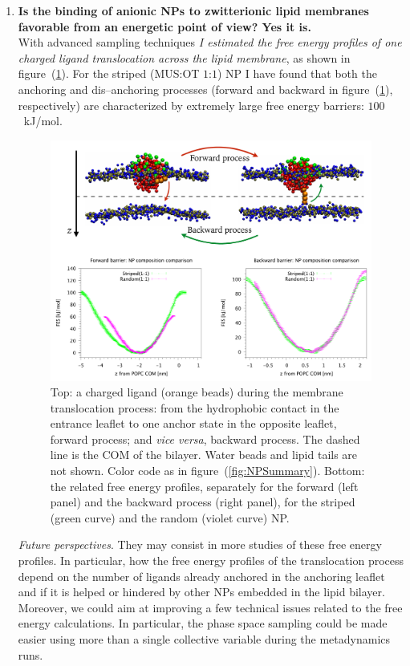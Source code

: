 \begin{enumerate}[label=\itshape\roman*.,listparindent=1em]
	\item \textbf{\textsf{Is the binding of anionic \acp{NP} to zwitterionic lipid membranes favorable from an energetic point of view? Yes it is.}}\\With advanced sampling techniques \textit{I estimated the free energy profiles of one charged ligand translocation across the lipid membrane}, as shown in figure~(\ref{fig:coglionazzo}). For the striped (\acs{MUS}:\acs{OT} $1$:$1$) \ac{NP} I have found that both the anchoring and dis--anchoring processes (forward and backward in figure~(\ref{fig:coglionazzo}), respectively) are characterized by extremely large free energy barriers: $100$~kJ/mol.%
\begin{figure}[ht]
	\center
	\includegraphics[width=1\textwidth]{./img/coglionazzo}
	\caption{Top: a charged ligand (orange beads) during the membrane translocation process: from the hydrophobic contact in the entrance leaflet to one anchor state in the opposite leaflet, forward process; and \textit{vice versa}, backward process. The dashed line is the \acs{COM} of the bilayer. Water beads and lipid tails are not shown. Color code as in figure~(\ref{fig:NPSummary}). Bottom: the related free energy profiles, separately for the forward (left panel) and the backward process (right panel), for the striped (green curve) and the random (violet curve) \acs{NP}.}%
	\label{fig:coglionazzo}
\end{figure}%
\newpage
	\indent\textit{Future perspectives}. They may consist in more studies of these free energy profiles. In particular, how the free energy profiles of the translocation process depend on the number of ligands already anchored in the anchoring leaflet and if it is helped or hindered by other \acp{NP} embedded in the lipid bilayer. Moreover, we could aim at improving a few technical issues related to the free energy calculations. In particular, the phase space sampling could be made easier using more than a single collective variable during the metadynamics runs.%


\end{enumerate}
